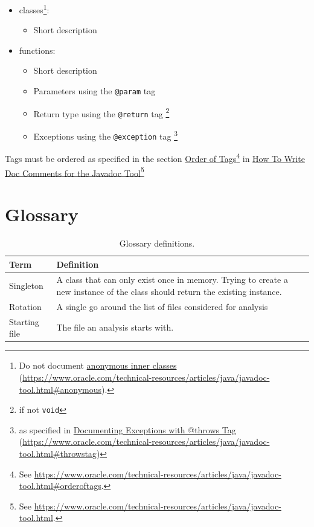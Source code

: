 \documentclass[11pt]{article} %
\begin{document}
    \begin{itemize}
        \item[] classes\footnote{Do not document \href{https://www.oracle.com/technical-resources/articles/java/javadoc-tool.html#anonymous}{anonymous inner classes} (\url{https://www.oracle.com/technical-resources/articles/java/javadoc-tool.html#anonymous}).}:
        \begin{itemize}
            \item Short description
        \end{itemize}
        \item[] functions:
        \begin{itemize}
            \item Short description
            \item Parameters using the \verb|@param| tag
            \item Return type using the \verb|@return| tag \footnote{if not \verb|void|}
            \item Exceptions using the \verb|@exception| tag \footnote{as specified in \href{https://www.oracle.com/technical-resources/articles/java/javadoc-tool.html#throwstag}{Documenting Exceptions with @throws Tag} (\url{https://www.oracle.com/technical-resources/articles/java/javadoc-tool.html#throwstag})}
        \end{itemize}
    \end{itemize}

    Tags must be ordered as specified in the section \href{https://www.oracle.com/technical-resources/articles/java/javadoc-tool.html#orderoftags}{Order of Tags}\footnote{See \url{https://www.oracle.com/technical-resources/articles/java/javadoc-tool.html#orderoftags}.} in \href{https://www.oracle.com/technical-resources/articles/java/javadoc-tool.html}{How To Write Doc Comments for the Javadoc Tool}\footnote{See \url{https://www.oracle.com/technical-resources/articles/java/javadoc-tool.html}.}

    \newpage


    \section{Glossary}

    \begin{table}[H]
        \centering
        \begin{tabular}{p{.3\linewidth} | p{.6\linewidth}}
            \textbf{Term} & \textbf{Definition}
            \\\hline
            Singleton & A class that can only exist once in memory. Trying to create a new instance of the class
            should return the existing instance. \\\hline
            Rotation      & A single go around the list of files considered for analysis \\\hline
            Starting file & The file an analysis starts with.
        \end{tabular}
        \caption{Glossary definitions.}
        \label{tab:glossary}
    \end{table}
    \printbibliography[heading=bibintoc]
    \listoffigures
    \listoftables
\end{document}
